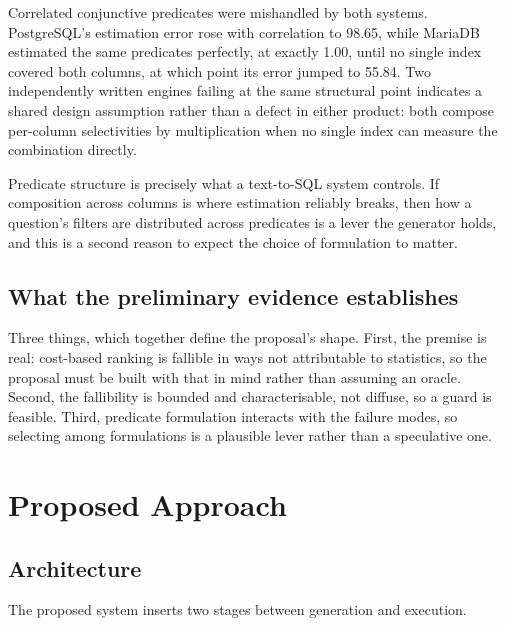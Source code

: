 \documentclass[12pt, a4paper]{article}
\begin{document}
Correlated conjunctive predicates were mishandled by both systems.
PostgreSQL's estimation error rose with correlation to 98.65, while
MariaDB estimated the same predicates perfectly, at exactly 1.00, until
no single index covered both columns, at which point its error jumped to
55.84. Two independently written engines failing at the same structural
point indicates a shared design assumption rather than a defect in
either product: both compose per-column selectivities by multiplication
when no single index can measure the combination directly.

Predicate structure is precisely what a text-to-SQL system controls. If
composition across columns is where estimation reliably breaks, then how
a question's filters are distributed across predicates is a lever the
generator holds, and this is a second reason to expect the choice of
formulation to matter.

\subsection{What the preliminary evidence establishes}

Three things, which together define the proposal's shape. First, the
premise is real: cost-based ranking is fallible in ways not attributable
to statistics, so the proposal must be built with that in mind rather
than assuming an oracle. Second, the fallibility is bounded and
characterisable, not diffuse, so a guard is feasible. Third, predicate
formulation interacts with the failure modes, so selecting among
formulations is a plausible lever rather than a speculative one.

\section{Proposed Approach}
\label{sec:approach}

\subsection{Architecture}

The proposed system inserts two stages between generation and execution.
\end{document}
